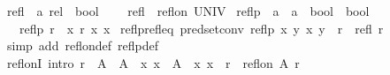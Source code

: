 \begin{isabellebody}
\isamarkupfalse%
\ refl\ {\isacharcolon}{\kern0pt}{\isacharcolon}{\kern0pt}\ {\isachardoublequoteopen}{\isacharprime}{\kern0pt}a\ rel\ {\isasymRightarrow}\ bool{\isachardoublequoteclose}\ %
\isanewline
\ \ \ {\isachardoublequoteopen}refl\ {\isasymequiv}\ refl{\isacharunderscore}{\kern0pt}on\ UNIV{\isachardoublequoteclose}\isanewline
\isanewline
{}\isamarkupfalse%
\ reflp\ {\isacharcolon}{\kern0pt}{\isacharcolon}{\kern0pt}\ {\isachardoublequoteopen}{\isacharparenleft}{\kern0pt}{\isacharprime}{\kern0pt}a\ {\isasymRightarrow}\ {\isacharprime}{\kern0pt}a\ {\isasymRightarrow}\ bool{\isacharparenright}{\kern0pt}\ {\isasymRightarrow}\ bool{\isachardoublequoteclose}\isanewline
\ \ \ {\isachardoublequoteopen}reflp\ r\ {\isasymlongleftrightarrow}\ {\isacharparenleft}{\kern0pt}{\isasymforall}x{\isachardot}{\kern0pt}\ r\ x\ x{\isacharparenright}{\kern0pt}{\isachardoublequoteclose}\isanewline
\isanewline
{}\isamarkupfalse%
\ reflp{\isacharunderscore}{\kern0pt}refl{\isacharunderscore}{\kern0pt}eq\ {\isacharbrackleft}{\kern0pt}pred{\isacharunderscore}{\kern0pt}set{\isacharunderscore}{\kern0pt}conv{\isacharbrackright}{\kern0pt}{\isacharcolon}{\kern0pt}\ {\isachardoublequoteopen}reflp\ {\isacharparenleft}{\kern0pt}{\isasymlambda}x\ y{\isachardot}{\kern0pt}\ {\isacharparenleft}{\kern0pt}x{\isacharcomma}{\kern0pt}\ y{\isacharparenright}{\kern0pt}\ {\isasymin}\ r{\isacharparenright}{\kern0pt}\ {\isasymlongleftrightarrow}\ refl\ r{\isachardoublequoteclose}\isanewline
%
\isadelimproof
\ \ %
\endisadelimproof
%
\isatagproof
{}\isamarkupfalse%
\ {\isacharparenleft}{\kern0pt}simp\ add{\isacharcolon}{\kern0pt}\ refl{\isacharunderscore}{\kern0pt}on{\isacharunderscore}{\kern0pt}def\ reflp{\isacharunderscore}{\kern0pt}def{\isacharparenright}{\kern0pt}%
\endisatagproof
{\isafoldproof}%
%
\isadelimproof
\isanewline
%
\endisadelimproof
\isanewline
{}\isamarkupfalse%
\ refl{\isacharunderscore}{\kern0pt}onI\ {\isacharbrackleft}{\kern0pt}intro{\isacharquery}{\kern0pt}{\isacharbrackright}{\kern0pt}{\isacharcolon}{\kern0pt}\ {\isachardoublequoteopen}r\ {\isasymsubseteq}\ A\ {\isasymtimes}\ A\ {\isasymLongrightarrow}\ {\isacharparenleft}{\kern0pt}{\isasymAnd}x{\isachardot}{\kern0pt}\ x\ {\isasymin}\ A\ {\isasymLongrightarrow}\ {\isacharparenleft}{\kern0pt}x{\isacharcomma}{\kern0pt}\ x{\isacharparenright}{\kern0pt}\ {\isasymin}\ r{\isacharparenright}{\kern0pt}\ {\isasymLongrightarrow}\ refl{\isacharunderscore}{\kern0pt}on\ A\ r{\isachardoublequoteclose}\isanewline

\end{isabellebody}
